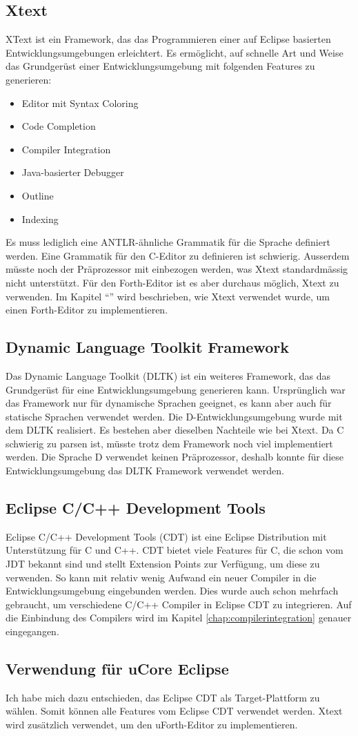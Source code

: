\subsection{Xtext}
XText ist ein Framework, das das Programmieren einer auf Eclipse basierten Entwicklungsumgebungen erleichtert. Es ermöglicht, auf schnelle Art und Weise das Grundgerüst einer Entwicklungsumgebung mit folgenden Features zu generieren:\cite{xtext}

\begin{itemize} 
	\item Editor mit Syntax Coloring
	\item Code Completion
	\item Compiler Integration
	\item Java-basierter Debugger
	\item Outline
	\item Indexing
\end{itemize}

Es muss lediglich eine ANTLR-ähnliche Grammatik für die Sprache definiert werden.\cite{antlr} Eine Grammatik für den C-Editor zu definieren ist schwierig. Ausserdem müsste noch der Präprozessor mit einbezogen werden, was Xtext standardmässig nicht unterstützt. \newline Für den Forth-Editor ist es aber durchaus möglich, Xtext zu verwenden. Im Kapitel "`"' wird beschrieben, wie Xtext verwendet wurde, um einen Forth-Editor zu implementieren.

\subsection{Dynamic Language Toolkit Framework}
Das Dynamic Language Toolkit (DLTK) ist ein weiteres Framework, das das Grundgerüst für eine Entwicklungsumgebung generieren kann. Ursprünglich war das Framework nur für dynamische Sprachen geeignet, es kann aber auch für statische Sprachen verwendet werden. Die D-Entwicklungsumgebung wurde mit dem DLTK realisiert\cite{ddt}. Es bestehen aber dieselben Nachteile wie bei Xtext. Da C schwierig zu parsen ist, müsste trotz dem Framework noch viel implementiert werden. Die Sprache D verwendet keinen Präprozessor, deshalb konnte für diese Entwicklungsumgebung das DLTK Framework verwendet werden.

\subsection{Eclipse C/C++ Development Tools}
Eclipse C/C++ Development Tools (CDT) ist eine Eclipse Distribution mit Unterstützung für C und C++. CDT bietet viele Features für C, die schon vom JDT bekannt sind und stellt Extension Points zur Verfügung, um diese zu verwenden. So kann mit relativ wenig Aufwand ein neuer Compiler in die Entwicklungsumgebung eingebunden werden. Dies wurde auch schon mehrfach gebraucht, um verschiedene C/C++ Compiler in Eclipse CDT zu integrieren. Auf die Einbindung des Compilers wird im Kapitel \ref{chap:compilerintegration} genauer eingegangen.

\subsection{Verwendung für uCore Eclipse}
Ich habe mich dazu entschieden, das Eclipse CDT als Target-Plattform zu wählen. Somit können alle Features vom Eclipse CDT verwendet werden. Xtext wird zusätzlich verwendet, um den uForth-Editor zu implementieren.
